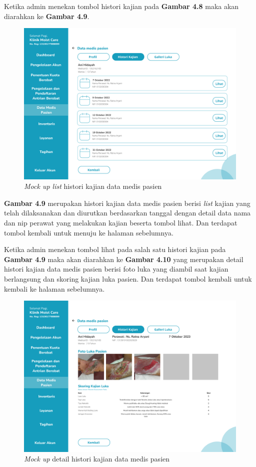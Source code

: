 \begin{enumerate}
	Ketika admin menekan tombol histori kajian pada \textbf{Gambar 4.8} maka akan diarahkan ke \textbf{Gambar 4.9}. 
	
	\begin{figure}[H]
		\centering
		\includegraphics[width=12cm]{gambar/mockup_web/Proses Pengobatan 3.png}
		\caption{\emph{Mock up list} histori kajian data medis pasien}
		\label{Gambar:pengelolaanantrian2}
	\end{figure}
	
	\textbf{Gambar 4.9} merupakan histori kajian data medis pasien berisi \emph{list} kajian yang telah dilaksanakan dan diurutkan berdasarkan tanggal dengan detail data nama dan nip perawat yang melakukan kajian beserta tombol lihat. Dan terdapat tombol kembali untuk menuju ke halaman sebelumnya.
	
	Ketika admin menekan tombol lihat pada salah satu histori kajian pada \textbf{Gambar 4.9} maka akan diarahkan ke \textbf{Gambar 4.10} yang merupakan detail histori kajian data medis pasien berisi foto luka yang diambil saat kajian berlangsung dan skoring kajian luka pasien. Dan terdapat tombol kembali untuk kembali ke halaman sebelumnya.
	
	\begin{figure}[H]
		\centering
		\includegraphics[width=12cm]{gambar/mockup_web/Proses Pengobatan 4.png}
		\caption{\emph{Mock up} detail histori kajian data medis pasien}
		\label{Gambar:pengelolaanantrian2}
	\end{figure}
	

\end{enumerate}
